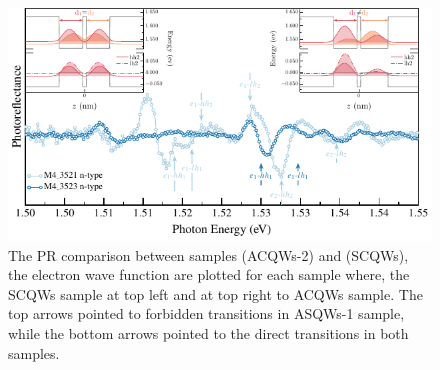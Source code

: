 \begin{figure}[ht!]
	\centering
	\includegraphics[width=\textwidth]{../figures/chapter-3/pr-plots/build/pr-set4.pdf}
	\caption{The PR comparison between samples  (ACQWs-2) and  (SCQWs), the electron wave function are plotted  for each sample where, the SCQWs sample at top left and at top right to ACQWs sample. The top arrows pointed to forbidden transitions in  ASQWs-1 sample, while the bottom arrows pointed to the direct transitions in both samples. }
	\label{fig:chapter-3-PR-PLOT-SET4}
\end{figure}

